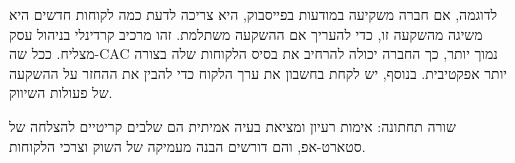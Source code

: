 לדוגמה, אם חברה משקיעה במודעות בפייסבוק, היא צריכה לדעת כמה לקוחות חדשים היא משיגה מהשקעה זו, כדי להעריך אם ההשקעה משתלמת. זהו מרכיב קרדינלי בניהול עסק מצליח. ככל שה-CAC נמוך יותר, כך החברה יכולה להרחיב את בסיס הלקוחות שלה בצורה יותר אפקטיבית. בנוסף, יש לקחת בחשבון את ערך הלקוח  כדי להבין את ההחזר על ההשקעה  של פעולות השיווק.

\begin{takeaway}
שורה תחתונה: אימות רעיון ומציאת בעיה אמיתית הם שלבים קריטיים להצלחה של סטארט-אפ, והם דורשים הבנה מעמיקה של השוק וצרכי הלקוחות.
\end{takeaway}
